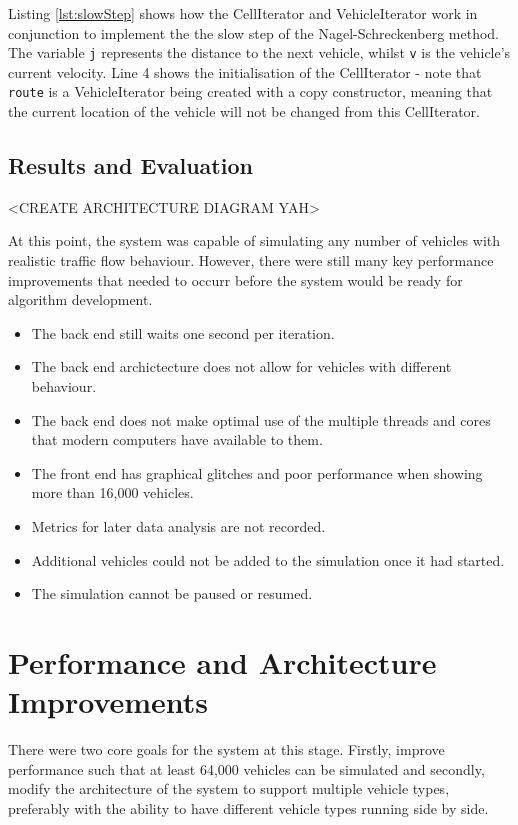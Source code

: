 \documentclass[ %
                    author={Alexander Hill},
                supervisor={Dr. Benjamin Sach},
                    degree={MEng},
                     title={MARMOSET},
                  subtitle={Multi-Agent Route Management using Online Simulation for Efficient Transportation},
                      type={research},
                      year={2016} ]{dissertation}
\begin{document}
Listing \ref{lst:slowStep} shows how the CellIterator and VehicleIterator work
in conjunction to implement the the slow step of the Nagel-Schreckenberg method.
The variable \texttt{j} represents the distance to the next vehicle, whilst
\texttt{v} is the vehicle's current velocity. Line 4 shows the initialisation of
the CellIterator - note that \texttt{route} is a VehicleIterator being created
with a copy constructor, meaning that the current location of the vehicle will
not be changed from this CellIterator.

\subsection{Results and Evaluation}

<CREATE ARCHITECTURE DIAGRAM YAH>

At this point, the system was capable of simulating any number of vehicles with
realistic traffic flow behaviour. However, there were still many key performance
improvements that needed to occurr before the system would be ready for
algorithm development.

\begin{itemize}
    \item The back end still waits one second per iteration.
    \item The back end archictecture does not allow for vehicles with different
        behaviour.
    \item The back end does not make optimal use of the multiple threads and
        cores that modern computers have available to them.
    \item The front end has graphical glitches and poor performance when
        showing more than 16,000 vehicles.
    \item Metrics for later data analysis are not recorded.
    \item Additional vehicles could not be added to the simulation once it had
        started.
    \item The simulation cannot be paused or resumed.
\end{itemize}

\section{Performance and Architecture Improvements}

There were two core goals for the system at this stage. Firstly, improve
performance such that at least 64,000 vehicles can be simulated and secondly,
modify the architecture of the system to support multiple vehicle types,
preferably with the ability to have different vehicle types running side by
side.
\end{document}
